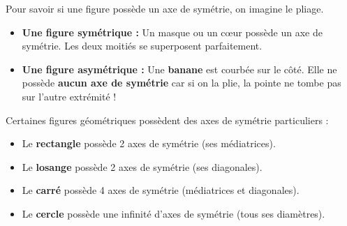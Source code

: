 \documentclass[a4paper]{book}
\begin{document}
    \begin{exemple}
        Pour savoir si une figure possède un axe de symétrie, on imagine le pliage.
        \begin{itemize}
            \item \textbf{Une figure symétrique :} Un masque ou un cœur possède un axe de symétrie. Les deux moitiés se superposent parfaitement.
            \item \textbf{Une figure asymétrique :} Une \textbf{banane} est courbée sur le côté. Elle ne possède \textbf{aucun axe de symétrie} car si on la plie, la pointe ne tombe pas sur l'autre extrémité !
        \end{itemize}
        
        \begin{center}
        \end{center}
    \end{exemple}
    
    
    \begin{propriete}
        Certaines figures géométriques possèdent des axes de symétrie particuliers :
        \begin{itemize}
            \item Le \textbf{rectangle} possède 2 axes de symétrie (ses médiatrices).
            \item Le \textbf{losange} possède 2 axes de symétrie (ses diagonales).
            \item Le \textbf{carré} possède 4 axes de symétrie (médiatrices et diagonales).
            \item Le \textbf{cercle} possède une infinité d'axes de symétrie (tous ses diamètres).
        \end{itemize}
    \end{propriete}
    
\end{document}
